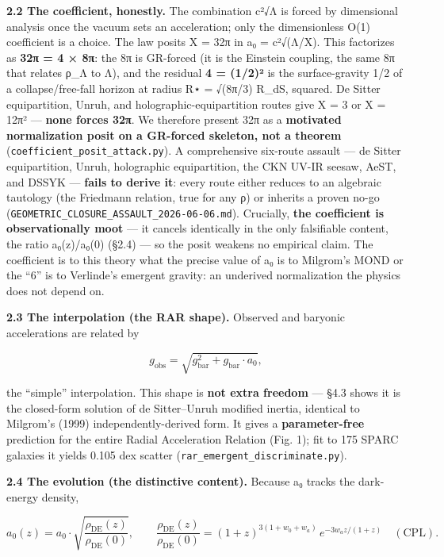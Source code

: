\documentclass[
]{article}
\newcounter{none} %
\begin{document}
\textbf{2.2 The coefficient, honestly.} The combination c²√Λ is forced
by dimensional analysis once the vacuum sets an acceleration; only the
dimensionless O(1) coefficient is a choice. The law posits X = 32π in a₀
= c²√(Λ/X). This factorizes as \textbf{32π = 4 × 8π}: the 8π is
GR-forced (it is the Einstein coupling, the same 8π that relates ρ\_Λ to
Λ), and the residual \textbf{4 = (1/2)²} is the surface-gravity 1/2 of a
collapse/free-fall horizon at radius R⋆ = √(8π/3) R\_dS, squared. De
Sitter equipartition, Unruh, and holographic-equipartition routes give X
= 3 or X = 12π² --- \textbf{none forces 32π}. We therefore present 32π
as a \textbf{motivated normalization posit on a GR-forced skeleton, not
a theorem} (\texttt{coefficient\_posit\_attack.py}). A comprehensive
six-route assault --- de Sitter equipartition, Unruh, holographic
equipartition, the CKN UV-IR seesaw, AeST, and DSSYK --- \textbf{fails
to derive it}: every route either reduces to an algebraic tautology (the
Friedmann relation, true for any ρ) or inherits a proven no-go
(\texttt{GEOMETRIC\_CLOSURE\_ASSAULT\_2026-06-06.md}). Crucially,
\textbf{the coefficient is observationally moot} --- it cancels
identically in the only falsifiable content, the ratio a₀(z)/a₀(0)
(§2.4) --- so the posit weakens no empirical claim. The coefficient is
to this theory what the precise value of a₀ is to Milgrom's MOND or the
``6'' is to Verlinde's emergent gravity: an underived normalization the
physics does not depend on.

\textbf{2.3 The interpolation (the RAR shape).} Observed and baryonic
accelerations are related by

\[g_{\mathrm{obs}} = \sqrt{g_{\mathrm{bar}}^2 + g_{\mathrm{bar}}\cdot a_0},\]

the ``simple'' interpolation. This shape is \textbf{not extra freedom}
--- §4.3 shows it is the closed-form solution of de Sitter--Unruh
modified inertia, identical to Milgrom's (1999) independently-derived
form. It gives a \textbf{parameter-free} prediction for the entire
Radial Acceleration Relation (Fig. 1); fit to 175 SPARC galaxies it
yields 0.105 dex scatter (\texttt{rar\_emergent\_discriminate.py}).

\textbf{2.4 The evolution (the distinctive content).} Because a₀ tracks
the dark-energy density,

\[a_0(z) = a_0\cdot\sqrt{\frac{\rho_{\mathrm{DE}}(z)}{\rho_{\mathrm{DE}}(0)}}, \qquad \frac{\rho_{\mathrm{DE}}(z)}{\rho_{\mathrm{DE}}(0)} = (1+z)^{3(1+w_0+w_a)}\, e^{-3w_a z/(1+z)} \quad (\mathrm{CPL}).\]
\end{document}
